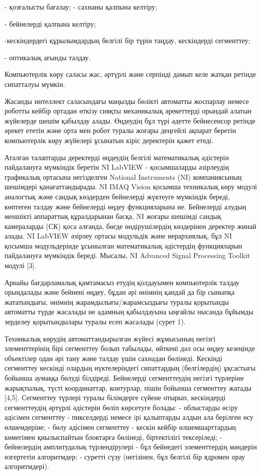 \begin{multicols}{2}
- қозғалысты бағалау; - сахнаны қалпына келтіру;

- бейнелерді қалпына келтіру;

-кескіндердегі құрылымдардың белгілі бір түрін таңдау, кескіндерді
сегменттеу;

- оптикалық ағынды талдау.

Компьютерлік көру саласы жас, әртүрлі және серпінді дамып келе жатқан
ретінде сипатталуы мүмкін.

Жасанды интеллект саласындағы маңызды бөлікті автоматты жоспарлау немесе
роботты кейбір ортадан өткізу сияқты механикалық әрекеттерді орындай
алатын жүйелерде шешім қабылдау алады. Өңдеудің бұл түрі әдетте
бейнесенсор ретінде әрекет ететін және орта мен робот туралы жоғары
деңгейлі ақпарат беретін компьютерлік көру жүйелері ұсынатын кіріс
деректерін қажет етеді.

Аталған талаптарды деректерді өңдеудің белгілі математикалық әдістерін
пайдалануға мүмкіндік беретін NI LabVIEW - қосымшаларды әзірлеудің
графикалық ортасына негізделген National Instruments (NI) компаниясының
шешімдері қанағаттандырады. NI IMAQ Vision қосымша техникалық көру
модулі аналогтық және сандық көздерден бейнелерді жүктеуге мүмкіндік
береді, көптеген талдау және бейнелерді өңдеу функцияларына ие.
Бейнелерді алудың меншікті аппараттық құралдарынан басқа, NI жоғары
шешімді сандық камераларды (СК) қоса алғанда, бөгде өндірушілердің
көздерінен деректер жинай алады. NI LabVIEW әзірлеу ортасы модульдік
және иерархиялық, бұл NI қосымша модульдерінде ұсынылған математикалық
әдістердің функцияларын пайдалануға мүмкіндік береді. Мысалы, NI
Advanced Signal Processing Toolkit модулі {[}3{]}.

Арнайы бағдарламалық қамтамасыз етудің қолдауымен компьютерлік талдау
орындалады және бейнені өңдеу, бұдан әрі өнімнің қандай да бір сыныпқа
жататындығы, өнімнің жарамдылығы/жарамсыздығы туралы қорытынды автоматты
түрде жасалады не адамның қабылдауына ыңғайлы нысанда бұйымды зерделеу
қорытындылары туралы есеп жасалады (сурет 1).

Техникалық көрудің автоматтандырылған жүйесі жұмысының негізгі
элементтерінің бірі сегменттеу болып табылады, өйткені дәл осы өңдеу
кезеңінде объектілер одан әрі тану және талдау үшін сахнадан бөлінеді.
Кескінді сегменттеу кескінді олардың нүктелеріндегі сипаттардың
(белгілердің) ұқсастығы бойынша аумаққа бөлуді білдіреді. Бейнелерді
сегменттеудің негізгі түрлеріне жарықтылық, түсті координаттар,
контурлар, пішін бойынша сегменттеу жатады {[}4,5{]}. Сегменттеу түрлері
туралы білімдерге сүйене отырып, кескіндерді сегменттеудің әртүрлі
әдістерін бөліп көрсетуге болады: - облыстарды өсiру әдiсiмен сегменттеу
- пикселдердi немесе iрi қалыптарды алдын ала берiлген өсу өлшемдеріне;
- бөлу әдісімен сегменттеу - кескін кейбір өлшемшарттардың көмегімен
қиылыспайтын блоктарға бөлінеді, біртектілігі тексеріледі; - бейнелердің
амплитудалық түрлендірулері - бұл бейнедегі элементтердің мәндерін
өзгертетін алгоритмдер; - суретті сүзу (негізінен, бұл белгілі бір
ядромен орау алгоритмдері).
\end{multicols}

